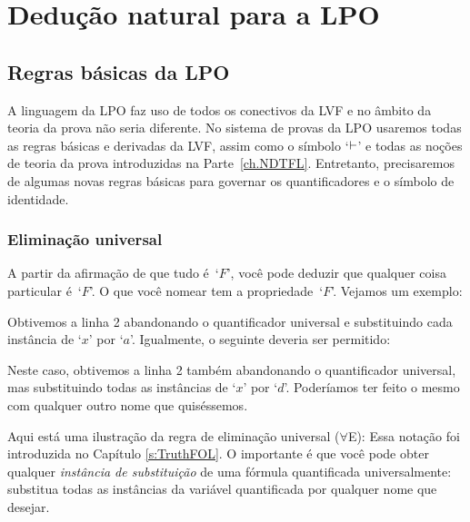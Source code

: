 \part{Dedução natural para a LPO}
\label{ch.NDFOL}

 
\chapter{Regras básicas da LPO}\label{s:BasicFOL}

A linguagem da LPO faz uso de todos os conectivos da LVF e no âmbito da teoria da prova não seria diferente. No sistema de provas da LPO usaremos todas as regras básicas e derivadas da LVF, assim como o símbolo `$\vdash$' e todas as noções de teoria da prova introduzidas na Parte~\ref{ch.NDTFL}. Entretanto, precisaremos de algumas novas regras básicas para governar os quantificadores e o símbolo de identidade. 

 
\section{Eliminação universal}

A partir da afirmação de que tudo é~`$F$', você pode deduzir que qualquer coisa particular é~`$F$'. O que você nomear tem a propriedade~`$F$'. Vejamos um exemplo:
\begin{fitchproof}
	 
\end{fitchproof}
 Obtivemos a linha 2 abandonando o quantificador universal e substituindo cada instância de `$x$' por `$a$'. Igualmente, o seguinte deveria ser permitido:
\begin{fitchproof}
	 
\end{fitchproof}

 
Neste caso, obtivemos a linha 2 também abandonando o quantificador universal, mas substituindo todas as instâncias de `$x$' por `$d$'. Poderíamos ter feito o mesmo com qualquer outro nome que quiséssemos.

Aqui está uma ilustração da regra de eliminação universal ($\forall$E):
Essa notação foi introduzida no Capítulo  \ref{s:TruthFOL}. O importante é que você pode obter qualquer \emph{instância de substituição} de uma fórmula quantificada universalmente: substitua todas as instâncias da variável quantificada por qualquer nome que desejar. 

